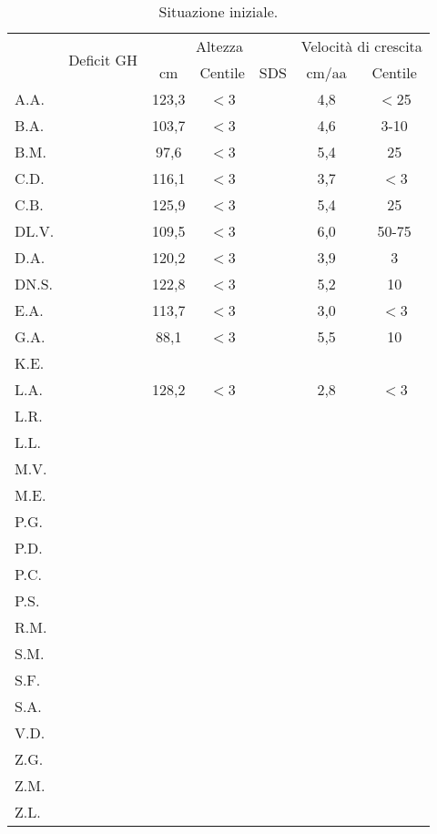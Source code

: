 \begin{table}[!h]
\begin{center}
\addtolength{\tabcolsep}{5pt}
\renewcommand{\arraystretch}{1.1}
\begin{tabular}{lcccccc}
\toprule
 & \multirow{2}{*}{Deficit GH} & \multicolumn{3}{c}{Altezza} & \multicolumn{2}{c}{Velocità di crescita} \\
 \cmidrule(r){3-5}  \cmidrule(r){6-7}
 &    									& cm & Centile & SDS & cm/aa & Centile \\
A.A.	&  				 				& 123,3 & $<$3 &  & 4,8 & $<$25  \\
B.A.	& \checkmark 	  				& 103,7 & $<$3 &  & 4,6 & 3-10   \\
B.M.	& \checkmark 	  				&  97,6 & $<$3 &  & 5,4 & 25     \\
C.D.	& \checkmark 	  				& 116,1 & $<$3 &  & 3,7 & $<$3   \\
C.B.	&  				 	            & 125,9 & $<$3 &  & 5,4 & 25     \\
DL.V.	& \checkmark 	  				& 109,5 & $<$3 &  & 6,0 & 50-75  \\
D.A.	&  				  				& 120,2 & $<$3 &  & 3,9 & 3      \\
DN.S.	& \checkmark 	  				& 122,8 & $<$3 &  & 5,2 & 10     \\
E.A.	&  				  				& 113,7 & $<$3 &  & 3,0 & $<$3   \\
G.A.	&  				  				&  88,1 & $<$3 &  & 5,5 & 10     \\
K.E.	&  				  				&  &  &  &  &    \\
L.A.	& \checkmark 	  				& 128,2 & $<$3 &  & 2,8 & $<$3   \\
L.R.	&  				  				&  &  &  &  &   \\
L.L.	&  				  				&  &  &  &  &   \\
M.V.	& \checkmark 	  				&  &  &  &  &   \\
M.E.	&  				  				&  &  &  &  &   \\
P.G.	& \checkmark 	  				&  &  &  &  &   \\
P.D.	&  				  				&  &  &  &  &   \\
P.C.	&  				  				&  &  &  &  &   \\
P.S.	&  				  				&  &  &  &  &   \\
R.M.	& \checkmark 	  				&  &  &  &  &   \\
S.M.	& \checkmark 	  				&  &  &  &  &   \\
S.F.	&  				  				&  &  &  &  &   \\
S.A.	&  				  				&  &  &  &  &   \\
V.D.	&  				  				&  &  &  &  &   \\
Z.G.	&  				  				&  &  &  &  &   \\
Z.M.	&  				  				&  &  &  &  &   \\
Z.L.	&  				  				&  &  &  &  &   \\
\bottomrule
\end{tabular}
\end{center}
\caption{Situazione iniziale.}
\label{tab:SituazioneIniziale}
\end{table}


